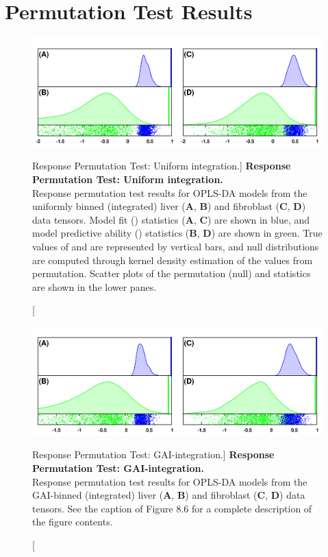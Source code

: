 \newpage
\section{Permutation Test Results}

\begin{figure}[ht!]
\includegraphics[width=6in]{figs/gaibin/06-perm-unif-int.png}
\caption
      [Response Permutation Test: Uniform integration.]{
  {\bf Response Permutation Test: Uniform integration.}
  \\
  Response permutation test results for OPLS-DA models from the uniformly
  binned (integrated) liver ({\bf A}, {\bf B}) and fibroblast
  ({\bf C}, {\bf D}) data tensors. Model fit (\rsqy{}) statistics
  ({\bf A}, {\bf C}) are shown in blue, and model predictive ability (\qsq{})
  statistics ({\bf B}, {\bf D}) are shown in green. True values of \rsqy{} and
  \qsq{} are represented by vertical bars, and null distributions are computed
  through kernel density estimation of the values from permutation. Scatter
  plots of the permutation (null) \rsqy{} and \qsq{} statistics are shown in
  the lower panes.
}
\label{figure.8.6}
\end{figure}

\begin{figure}[ht!]
\includegraphics[width=6in]{figs/gaibin/07-perm-gai-int.png}
\caption
      [Response Permutation Test: GAI-integration.]{
  {\bf Response Permutation Test: GAI-integration.}
  \\
  Response permutation test results for OPLS-DA models from the GAI-binned
  (integrated) liver ({\bf A}, {\bf B}) and fibroblast
  ({\bf C}, {\bf D}) data tensors. See the caption of Figure 8.6 for a
  complete description of the figure contents.
}
\label{figure.8.7}
\end{figure}

